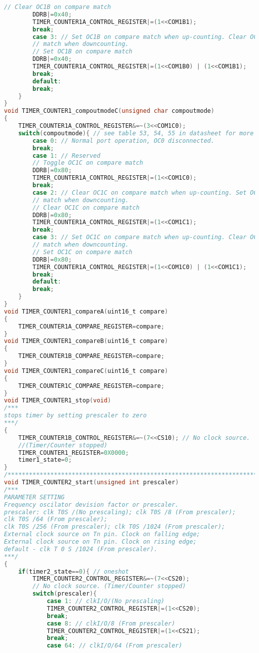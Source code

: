 \begin{lstlisting}[language=C]
		// Clear OC1B on compare match
		DDRB|=0x40;
		TIMER_COUNTER1A_CONTROL_REGISTER|=(1<<COM1B1);
		break;
		case 3: // Set OC1B on compare match when up-counting. Clear OC0 on compare
		// match when downcounting.
		// Set OC1B on compare match
		DDRB|=0x40;
		TIMER_COUNTER1A_CONTROL_REGISTER|=(1<<COM1B0) | (1<<COM1B1);
		break;
		default:
		break;
	}
}
void TIMER_COUNTER1_compoutmodeC(unsigned char compoutmode)
{
	TIMER_COUNTER1A_CONTROL_REGISTER&=~(3<<COM1C0);
	switch(compoutmode){ // see table 53, 54, 55 in datasheet for more information
		case 0: // Normal port operation, OC0 disconnected.
		break;
		case 1: // Reserved
		// Toggle OC1C on compare match
		DDRB|=0x80;
		TIMER_COUNTER1A_CONTROL_REGISTER|=(1<<COM1C0);
		break;
		case 2: // Clear OC1C on compare match when up-counting. Set OC0 on compare
		// match when downcounting.
		// Clear OC1C on compare match
		DDRB|=0x80;
		TIMER_COUNTER1A_CONTROL_REGISTER|=(1<<COM1C1);
		break;
		case 3: // Set OC1C on compare match when up-counting. Clear OC0 on compare
		// match when downcounting.
		// Set OC1C on compare match
		DDRB|=0x80;
		TIMER_COUNTER1A_CONTROL_REGISTER|=(1<<COM1C0) | (1<<COM1C1);
		break;
		default:
		break;
	}
}
void TIMER_COUNTER1_compareA(uint16_t compare)
{
	TIMER_COUNTER1A_COMPARE_REGISTER=compare;
}
void TIMER_COUNTER1_compareB(uint16_t compare)
{
	TIMER_COUNTER1B_COMPARE_REGISTER=compare;
}
void TIMER_COUNTER1_compareC(uint16_t compare)
{
	TIMER_COUNTER1C_COMPARE_REGISTER=compare;
}
void TIMER_COUNTER1_stop(void)
/***
stops timer by setting prescaler to zero
***/
{
	TIMER_COUNTER1B_CONTROL_REGISTER&=~(7<<CS10); // No clock source.
	//(Timer/Counter stopped)
	TIMER_COUNTER1_REGISTER=0X0000;
	timer1_state=0;
}
/*****************************************************************************************/
void TIMER_COUNTER2_start(unsigned int prescaler)
/***
PARAMETER SETTING
Frequency oscilator devision factor or prescaler.
prescaler: clk T0S /(No prescaling); clk T0S /8 (From prescaler);
clk T0S /64 (From prescaler);
clk T0S /256 (From prescaler); clk T0S /1024 (From prescaler);
External clock source on Tn pin. Clock on falling edge;
External clock source on Tn pin. Clock on rising edge;
default - clk T 0 S /1024 (From prescaler).
***/
{
	if(timer2_state==0){ // oneshot
		TIMER_COUNTER2_CONTROL_REGISTER&=~(7<<CS20);
		// No clock source. (Timer/Counter stopped)
		switch(prescaler){
			case 1: // clkI/O/(No prescaling)
			TIMER_COUNTER2_CONTROL_REGISTER|=(1<<CS20);
			break;
			case 8: // clkI/O/8 (From prescaler)
			TIMER_COUNTER2_CONTROL_REGISTER|=(1<<CS21);
			break;
			case 64: // clkI/O/64 (From prescaler)

\end{lstlisting}
